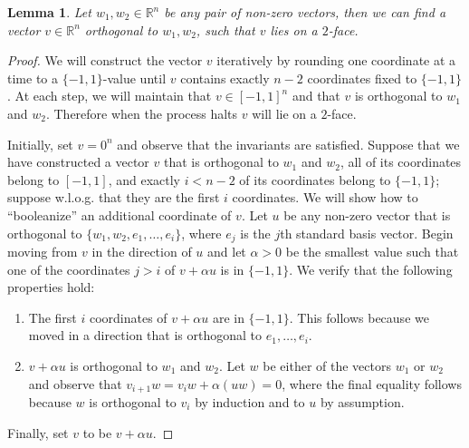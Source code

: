 \documentclass[11pt]{article}
\numberwithin{equation}{section}
\newtheorem{lemma}[theorem]{Lemma}
\theoremstyle{definition}
\theoremstyle{plain}
\begin{document}
\begin{lemma} \label{lem:orthogonal_vector}
Let $w_1, w_2 \in \mathbb{R}^n$ be any pair of non-zero vectors, then we can find a vector $v \in \mathbb{R}^n$ orthogonal to $w_1, w_2$, such that $v$ lies on a $2$-face.
\end{lemma}
\begin{proof}
	We will construct the vector $v$ iteratively by rounding one coordinate at a time to a $\{-1,1\}$-value until $v$ contains exactly $n-2$ coordinates fixed to $\{-1,1\}$. At each step, we will maintain that $v \in [-1,1]^n$ and that $v$ is orthogonal to $w_1$ and $w_2$. Therefore when the process halts $v$ will lie on a $2$-face.
	
	Initially, set $v = 0^n$ and observe that the invariants are satisfied. Suppose that we have constructed a vector $v$ that is orthogonal to $w_1$ and $w_2$, all of its coordinates belong to $[-1,1]$, and exactly $i < n-2$ of its coordinates belong to $\{-1,1\}$; suppose w.l.o.g. that they are the first $i$ coordinates. We will show how to ``booleanize'' an additional coordinate of $v$. Let $u$ be any non-zero vector that is orthogonal to $\{w_1, w_2, e_1, \ldots, e_i\}$, where $e_j$ is the $j$th standard basis vector. Begin moving from $v$ in the direction of $u$ and let $\alpha > 0$ be the smallest value such that one of the coordinates $j > i$ of $v + \alpha u$ is in $\{-1, 1\}$. %
	We verify that the following properties hold:
	\begin{enumerate}
		\item The first $i$ coordinates of $v + \alpha u$ are in $\{ -1, 1\}$. This follows because we moved in a direction that is orthogonal to $e_1, \ldots, e_i$. %
		\item $v + \alpha u$ is orthogonal to $w_1$ and $w_2$. Let $w$ be either of the vectors $w_1$ or $w_2$ and observe that  $v_{i+1}w = v_iw + \alpha (uw) = 0$,
		where the final equality follows because $w$ is orthogonal to $v_i$ by induction and to $u$ by assumption. 
	\end{enumerate}
	Finally, set $v$ to be  $v + \alpha u$. 
\end{proof}
\end{document}
